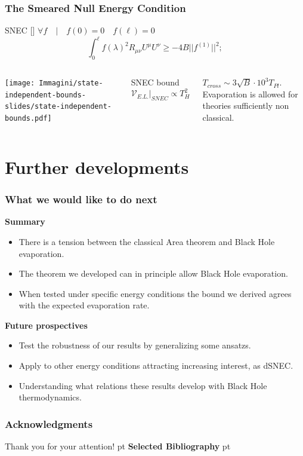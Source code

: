\documentclass[]{beamer}
\begin{document}
	\begin{frame}
		\frametitle{The Smeared Null Energy Condition}
		\begin{defblock}{SNEC [\cite[]{freivogel2018smeared}]}
			\(\forall f \quad\vert\quad f(0) = 0 \quad f(\ell) = 0\)
			\[
			\int_0^{\ell} f(\lambda)^2 R_{\mu\nu}U^{\mu}U^{\nu} \ge -4B\vert\vert f^{(1)}\vert\vert^2;
			\]
		\end{defblock}
	
		\begin{columns}
			\centering
			\vskip -7pt
			\texttt{[image: Immagini/state-independent-bounds-slides/state-independent-bounds.pdf]}

			\centering
			\vskip -15pt
			\begin{ideablock}{SNEC bound}
				\[
				\mathcal{V}_{E.L.}\Big\vert_{SNEC} \propto T_H^2	
				\]
			\end{ideablock}
			\vskip 5pt
			\(T_{cross} \sim 3\sqrt{B}\cdot 10^3 T_{Pl}\).
			Evaporation is allowed for theories sufficiently non classical.
		\end{columns}
	\end{frame}

	
	\section{Further developments}
	\begin{frame}
		\frametitle{What we would like to do next}
		\textbf{Summary}
		\begin{itemize}
			\item There is a tension between the classical Area theorem and Black Hole evaporation.
			\item The theorem we developed can in principle allow Black Hole evaporation.
			\item When tested under specific energy conditions the bound we derived agrees with the expected evaporation rate.
		\end{itemize}
		\textbf{Future prospectives}
		\begin{itemize}
			\item Test the robustness of our results by generalizing some ansatzs.
			\item Apply to other energy conditions attracting increasing interest, as dSNEC.
			\item Understanding what relations these results develop with Black Hole thermodynamics.
		\end{itemize}
	\end{frame}

	\begin{frame}[allowframebreaks]
		\frametitle{Acknowledgments}
		{\Huge
		\textcolor{turquoise!80!black}{Thank you for your attention!}}
		\vskip 15 pt
		\textbf{Selected Bibliography}
		\vskip 10 pt
		\printbibliography
	\end{frame}
\end{document}
